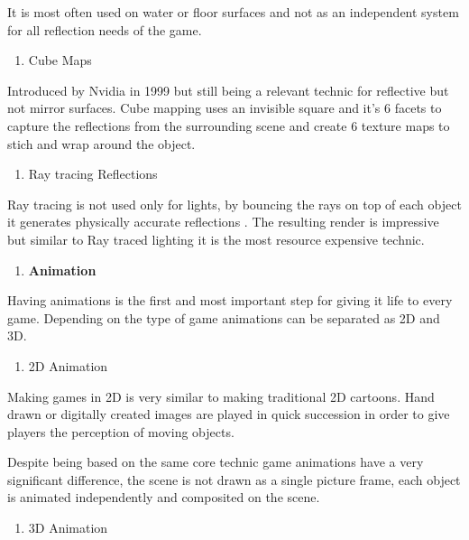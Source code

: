 \documentclass[a4paper,one side,12pt]{book}
\begin{document}
It is most often used on water or floor surfaces and not as an
independent system for all reflection needs of the game.

\begin{enumerate}
\def\labelenumi{\alph{enumi})}
\setcounter{enumi}{2}
\item
  Cube Maps
\end{enumerate}

Introduced by Nvidia in 1999 but still being a relevant technic for
reflective but not mirror surfaces. Cube mapping uses an invisible
square and it's 6 facets to capture the reflections from
the surrounding scene and create 6 texture maps to stich and wrap around
the object.

\begin{enumerate}
\def\labelenumi{\alph{enumi})}
\setcounter{enumi}{3}
\item
  Ray tracing Reflections
\end{enumerate}

Ray tracing is not used only for lights, by bouncing the rays on top of
each object it generates physically accurate reflections \cite{nvidia_2018_ray}. The
resulting render is impressive but similar to Ray traced lighting it is
the most resource expensive technic.

\begin{enumerate}
\def\labelenumi{\arabic{enumi}.}
\setcounter{enumi}{2}
\item
  \textbf{Animation}
\end{enumerate}

Having animations is the first and most important step for giving it
life to every game. Depending on the type of game animations can be
separated as 2D and 3D.

\begin{enumerate}
\def\labelenumi{\alph{enumi})}
\item
  2D Animation
\end{enumerate}

Making games in 2D is very similar to making traditional 2D cartoons.
Hand drawn or digitally created images are played in quick succession in
order to give players the perception of moving objects.

Despite being based on the same core technic game animations have a very
significant difference, the scene is not drawn as a single picture
frame, each object is animated independently and composited on the
scene.

\begin{enumerate}
\def\labelenumi{\alph{enumi})}
\setcounter{enumi}{1}
\item
  3D Animation
\end{enumerate}
\end{document}
